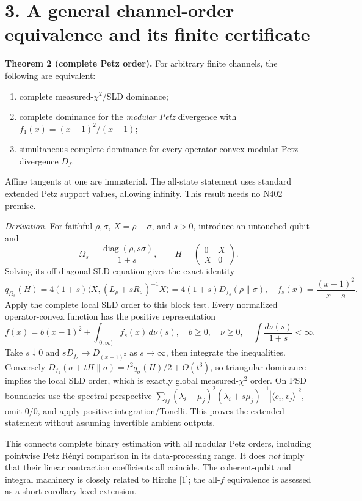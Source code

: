 \documentclass[10pt,a4paper]{article}
\begin{document}
\section*{3. A general channel-order equivalence and its finite certificate}

\textbf{Theorem 2 (complete Petz order).} For arbitrary finite channels, the following are equivalent:
\begin{enumerate}
\item complete measured-$\chi^2$/SLD dominance;
\item complete dominance for the \emph{modular Petz} divergence with $f_1(x)=(x-1)^2/(x+1)$;
\item simultaneous complete dominance for every operator-convex modular Petz divergence $D_f$.
\end{enumerate}
Affine tangents at one are immaterial. The all-state statement uses standard extended Petz support values, allowing infinity. This result needs no N402 premise.

\textit{Derivation.} For faithful $\rho,\sigma$, $X=\rho-\sigma$, and $s>0$, introduce an untouched qubit and
\[
 \Omega_s=\frac{\operatorname{diag}(\rho,s\sigma)}{1+s},\qquad
 H=\begin{pmatrix}0&X\\X&0\end{pmatrix}.
\]
Solving its off-diagonal SLD equation gives the exact identity
\[
 q_{\Omega_s}(H)=4(1+s)\langle X,(L_\rho+sR_\sigma)^{-1}X\rangle
              =4(1+s)D_{f_s}(\rho\|\sigma),\quad
 f_s(x)=\frac{(x-1)^2}{x+s}. \tag{10}
\]
Apply the complete local SLD order to this block test. Every normalized operator-convex function has the positive representation
\[
 f(x)=b(x-1)^2+\int_{[0,\infty)}f_s(x)\,d\nu(s),\quad
 b\ge0,\quad\nu\ge0,\quad\int\frac{d\nu(s)}{1+s}<\infty. \tag{11}
\]
Take $s\downarrow0$ and $sD_{f_s}\to D_{(x-1)^2}$ as $s\to\infty$, then integrate the inequalities. Conversely
$D_{f_1}(\sigma+tH\|\sigma)=t^2q_\sigma(H)/2+O(t^3)$, so triangular dominance implies the local SLD order, which is exactly global measured-$\chi^2$ order. On PSD boundaries use the spectral perspective
$\sum_{ij}(\lambda_i-\mu_j)^2(\lambda_i+s\mu_j)^{-1}|\langle e_i,v_j\rangle|^2$, omit $0/0$, and apply positive integration/Tonelli. This proves the extended statement without assuming invertible ambient outputs.

This connects complete binary estimation with all modular Petz orders, including pointwise Petz R\'enyi comparison in its data-processing range. It does \emph{not} imply that their linear contraction coefficients all coincide. The coherent-qubit and integral machinery is closely related to Hirche [1]; the all-$f$ equivalence is assessed as a short corollary-level extension.
\end{document}
